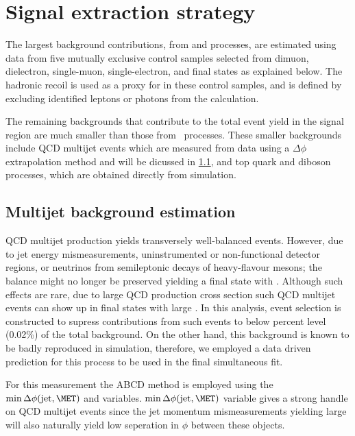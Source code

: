 \section{Signal extraction strategy} \label{sec:signalextraction}

The largest background contributions, from \Zvvjets and \Wlvjets processes,
are estimated using data from five mutually exclusive control samples selected
from dimuon, dielectron, single-muon, single-electron, and \phojets final states
as explained below. The hadronic recoil \pt is used as a proxy for \ptmiss in these
control samples, and is defined by excluding identified leptons or photons from
the \ptmiss calculation.

The remaining backgrounds that contribute to the total event yield in the signal region
are much smaller than those from \Wlvjets~processes. These smaller backgrounds
include QCD multijet events which are measured from data using a $\Delta\phi$ extrapolation
method and will be dicussed in \ref{sec:minor_bkg}, and top quark and diboson processes, which are
obtained directly from simulation.

\subsection{Multijet background estimation}\label{sec:minor_bkg}

QCD multijet production yields transversely well-balanced events. 
However, due to jet energy mismeasurements, uninstrumented or 
non-functional detector regions, or neutrinos from semileptonic 
decays of heavy-flavour mesons; the balance might no longer be preserved yielding
a final state with \ETmiss. Although such effects are rare, due to large QCD 
production cross section such QCD multijet events can show up in final states with large \ETmiss.
In this analysis, event selection is constructed to supress contributions 
from such events to below percent level (0.02\%) of the total background. 
On the other hand, this background is known to be badly reproduced in simulation, 
therefore, we employed a data driven prediction for this process to be used in the 
final simultaneous fit. 

For this measurement the ABCD method is employed using the $\min\Delta\phi({\rm jet,\MET})$ 
and \ETmiss variables. $\min\Delta\phi({\rm jet,\MET})$ variable gives a strong handle on QCD 
multijet events since the jet momentum mismeasurements yielding large \ETmiss will also naturally
yield low seperation in $\phi$ between these objects. 

